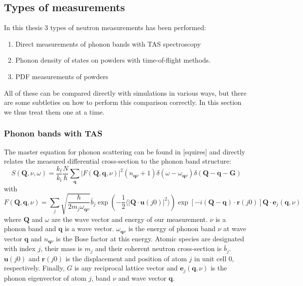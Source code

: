\subsection{Types of measurements}
In this thesis 3 types of neutron measurements has been performed:

\begin{enumerate}
	\item Direct measurements of phonon bands with TAS spectroscopy
	\item Phonon density of states on powders with time-of-flight methods.
	\item PDF measurements of powders
\end{enumerate}

\noindent All of these can be compared directly with simulations in various ways, but there are some subtleties on how to perform this comparison correctly. In this section we thus treat them one at a time.

\subsubsection{Phonon bands with TAS}
The master equation for phonon scattering can be found in [squires] and directly relates the measured differential cross-section to the phonon band structure:
%
\begin{equation}
	S(\bm{Q},\nu,\omega) = \frac{k_\text{f}}{k_\text{i}} \frac{N}{\hbar} \sum_{\bm{q}} | F(\bm{Q},\bm{q},\nu) |^2 ( n_{\bm{q}\nu} + 1) \delta (\omega - \omega_{\bm{q}\nu}) \delta(\bm{Q} - \bm{q} - \bm{G})
	\label{eq:one_phonon_sqw}
\end{equation}
%
with
%
\[
	F(\bm{Q}, \bm{q}, \nu) = \sum_j \sqrt{\frac{\hbar}{2 m_j \omega_{\bm{q}\nu}}} \bar{b}_j \exp \left( -\frac{1}{2} \langle | \bm{Q} \cdot \bm{u}(j0) |^2 \rangle \right) \exp [ -i(\bm{Q} - \bm{q}) \cdot \bm{r}(j0) ] \bm{Q} \cdot \bm{e}_j(\bm{q},\nu)
\]
%
where $\bm{Q}$ and $\omega$ are the wave vector and energy of our measurement. $\nu$ is a phonon band and $\bm{q}$ is a wave vector. $\omega_{\bm{q}\nu}$ is the energy of phonon band $\nu$ at wave vector $\bm{q}$ and $n_{\bm{q}\nu}$ is the Bose factor at this energy. Atomic species are designated with index $j$, their mass is $m_j$ and their coherent neutron cross-section is $\bar{b}_j$. $\bm{u}(j0)$ and $\bm{r}(j0)$ is the displacement and position of atom $j$ in unit cell 0, respectively. Finally, $G$ is any reciprocal lattice vector and $\bm{e}_j(\bm{q},\nu)$ is the phonon eigenvector of atom $j$, band $\nu$ and wave vector $\bm{q}$.

